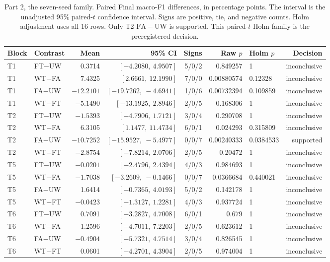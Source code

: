 \documentclass{ieeeaccess}
\begin{document}
\begin{table}[!t]
\centering
\caption{Part 2, the seven-seed family. Paired Final macro-F1 differences, in percentage points. The interval is the unadjusted 95\% paired-$t$ confidence interval. Signs are positive, tie, and negative counts. Holm adjustment uses all 16 rows. Only T2 $\mathrm{FA}-\mathrm{UW}$ is supported. This paired-$t$ Holm family is the preregistered decision.}
\label{tab:e4}
\scriptsize
\begin{tabular}{llrrrrlr}
\hline
Block & Contrast & Mean & 95\% CI & Signs & Raw $p$ & Holm $p$ & Decision \\
\hline
T1 & FT$-$UW & 0.3714 & $[-4.2080,\ 4.9507]$ & 5/0/2 & 0.849257 & 1 & inconclusive \\
T1 & WT$-$FA & 7.4325 & $[2.6661,\ 12.1990]$ & 7/0/0 & 0.00880574 & 0.12328 & inconclusive \\
T1 & FA$-$UW & $-12.2101$ & $[-19.7262,\ -4.6941]$ & 1/0/6 & 0.00732394 & 0.109859 & inconclusive \\
T1 & WT$-$FT & $-5.1490$ & $[-13.1925,\ 2.8946]$ & 2/0/5 & 0.168306 & 1 & inconclusive \\
T2 & FT$-$UW & $-1.5393$ & $[-4.7906,\ 1.7121]$ & 3/0/4 & 0.290708 & 1 & inconclusive \\
T2 & WT$-$FA & 6.3105 & $[1.1477,\ 11.4734]$ & 6/0/1 & 0.024293 & 0.315809 & inconclusive \\
T2 & FA$-$UW & $-10.7252$ & $[-15.9527,\ -5.4977]$ & 0/0/7 & 0.00240333 & 0.0384533 & supported \\
T2 & WT$-$FT & $-2.8754$ & $[-7.8214,\ 2.0706]$ & 2/0/5 & 0.20472 & 1 & inconclusive \\
T5 & FT$-$UW & $-0.0201$ & $[-2.4796,\ 2.4394]$ & 4/0/3 & 0.984693 & 1 & inconclusive \\
T5 & WT$-$FA & $-1.7038$ & $[-3.2609,\ -0.1466]$ & 0/0/7 & 0.0366684 & 0.440021 & inconclusive \\
T5 & FA$-$UW & 1.6414 & $[-0.7365,\ 4.0193]$ & 5/0/2 & 0.142178 & 1 & inconclusive \\
T5 & WT$-$FT & $-0.0423$ & $[-1.3127,\ 1.2281]$ & 4/0/3 & 0.937724 & 1 & inconclusive \\
T6 & FT$-$UW & 0.7091 & $[-3.2827,\ 4.7008]$ & 6/0/1 & 0.679 & 1 & inconclusive \\
T6 & WT$-$FA & 1.2596 & $[-4.7011,\ 7.2203]$ & 2/0/5 & 0.623612 & 1 & inconclusive \\
T6 & FA$-$UW & $-0.4904$ & $[-5.7321,\ 4.7514]$ & 3/0/4 & 0.826545 & 1 & inconclusive \\
T6 & WT$-$FT & 0.0601 & $[-4.2701,\ 4.3904]$ & 2/0/5 & 0.974004 & 1 & inconclusive \\
\hline
\end{tabular}
\end{table}
\end{document}
